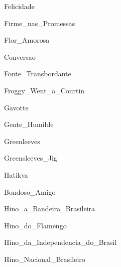 \documentclass{scrartcl}
\begin{document}

{Felicidade}


{Firme_nas_Promessas}


{Flor_Amorosa}


{Conversao}


{Fonte_Transbordante}


{Froggy_Went_a_Courtin}


{Gavotte}


{Gente_Humilde}


{Greenleeves}


{Greensleeves_Jig}


{Hatikva}


{Bondoso_Amigo}


{Hino_a_Bandeira_Brasileira}


{Hino_do_Flamengo}


{Hino_da_Independencia_do_Brasil}


{Hino_Nacional_Brasileiro}
\end{document}
